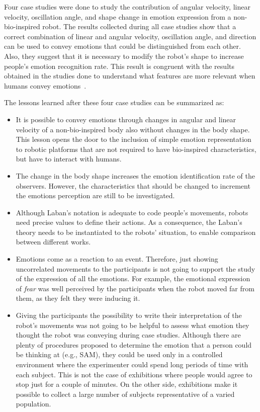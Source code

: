 Four case studies were done to study the contribution of angular velocity, linear velocity, oscillation angle, and shape change in emotion expression from a non-bio-inspired robot. The results collected during all case studies show that a correct combination of linear and angular velocity, oscillation angle, and direction can be used to convey emotions that could be distinguished from each other. Also, they suggest that it is necessary to modify the robot's shape to increase people's emotion recognition rate. This result is congruent with the results obtained in the studies done to understand what features are more relevant when humans convey emotions~\cite{Roether2009,Venture2014}.

The lessons learned after these four case studies can be summarized as:

\begin{itemize}
	
	\item It is possible to convey emotions through changes in angular and linear velocity of a non-bio-inspired body also without changes in the body shape. This lesson opens the door to the inclusion of simple emotion representation to robotic platforms that are not required to have bio-inspired characteristics, but have to interact with humans.
	
	\item The change in the body shape increases the emotion identification rate of the observers. However, the characteristics that should be changed to increment the emotions perception are still to be investigated.
	
	\item Although Laban's notation is adequate to code people's movements, robots need precise values to define their actions. As a consequence, the Laban's theory needs to be instantiated to the robots' situation, to enable comparison between different works.
	
	\item Emotions come as a reaction to an event. Therefore, just showing uncorrelated movements to the participants is not going to support the study of the expression of all the emotions. For example, the emotional expression of \textit{fear} was well perceived by the participants when the robot moved far from them, as they felt they were inducing it.
	
	\item Giving the participants the possibility to write their interpretation of the robot's movements was not going to be helpful to assess what emotion they thought the robot was conveying during case studies. Although there are plenty of procedures proposed to determine the emotion that a person could be thinking at (e.g., SAM), they could be used only in a controlled environment where the experimenter could spend long periods of time with each subject. This is not the case of exhibitions where people would agree to stop just for a couple of minutes. On the other side, exhibitions make it possible to collect a large number of subjects representative of a varied population.
	

\end{itemize}
